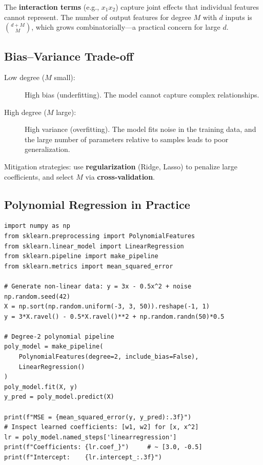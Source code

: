 The \textbf{interaction terms} (e.g., $x_1 x_2$) capture joint effects that individual features cannot represent. The number of output features for degree $M$ with $d$ inputs is $\binom{d + M}{M}$, which grows combinatorially---a practical concern for large $d$.

\subsection*{Bias--Variance Trade-off}

\begin{description}
    \item[Low degree ($M$ small):] High bias (underfitting). The model cannot capture complex relationships.
    \item[High degree ($M$ large):] High variance (overfitting). The model fits noise in the training data, and the large number of parameters relative to samples leads to poor generalization.
\end{description}

Mitigation strategies: use \textbf{regularization} (Ridge, Lasso) to penalize large coefficients, and select $M$ via \textbf{cross-validation}.

\subsection*{Polynomial Regression in Practice}

\begin{lstlisting}[style=pythonstyle]
import numpy as np
from sklearn.preprocessing import PolynomialFeatures
from sklearn.linear_model import LinearRegression
from sklearn.pipeline import make_pipeline
from sklearn.metrics import mean_squared_error

# Generate non-linear data: y = 3x - 0.5x^2 + noise
np.random.seed(42)
X = np.sort(np.random.uniform(-3, 3, 50)).reshape(-1, 1)
y = 3*X.ravel() - 0.5*X.ravel()**2 + np.random.randn(50)*0.5

# Degree-2 polynomial pipeline
poly_model = make_pipeline(
    PolynomialFeatures(degree=2, include_bias=False),
    LinearRegression()
)
poly_model.fit(X, y)
y_pred = poly_model.predict(X)

print(f"MSE = {mean_squared_error(y, y_pred):.3f}")
# Inspect learned coefficients: [w1, w2] for [x, x^2]
lr = poly_model.named_steps['linearregression']
print(f"Coefficients: {lr.coef_}")     # ~ [3.0, -0.5]
print(f"Intercept:    {lr.intercept_:.3f}")
\end{lstlisting}

